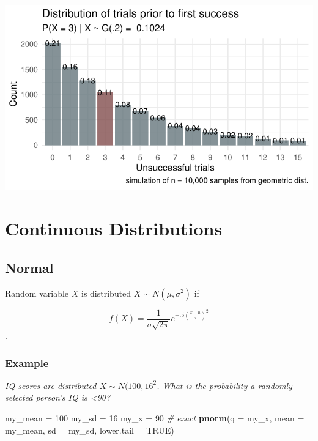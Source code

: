 \documentclass[]{book}
\newenvironment{Shaded}{\begin{snugshade}}{\end{snugshade}}
\newcommand{\CommentTok}[1]{\textcolor[rgb]{0.56,0.35,0.01}{\textit{#1}}}
\newcommand{\DataTypeTok}[1]{\textcolor[rgb]{0.13,0.29,0.53}{#1}}
\newcommand{\DecValTok}[1]{\textcolor[rgb]{0.00,0.00,0.81}{#1}}
\newcommand{\KeywordTok}[1]{\textcolor[rgb]{0.13,0.29,0.53}{\textbf{#1}}}
\newcommand{\NormalTok}[1]{#1}
\newcommand{\OtherTok}[1]{\textcolor[rgb]{0.56,0.35,0.01}{#1}}
\newcommand{\StringTok}[1]{\textcolor[rgb]{0.31,0.60,0.02}{#1}}
\begin{document}
\includegraphics{data-sci_files/figure-latex/unnamed-chunk-12-1.pdf}

\hypertarget{continuous-distributions}{%
\section{Continuous Distributions}\label{continuous-distributions}}

\hypertarget{normal}{%
\subsection{Normal}\label{normal}}

Random variable \(X\) is distributed \(X \sim N(\mu, \sigma^2)\) if

\[f(X)=\frac{{1}}{{\sigma \sqrt{{2\pi}}}}e^{-.5(\frac{{x-\mu}}{{\sigma}})^2}\].

\hypertarget{example}{%
\subsubsection*{Example}\label{example}}

\emph{IQ scores are distributed \(X \sim N(100, 16^2\). What is the probability a randomly selected person's IQ is \textless90?}

\begin{Shaded}
\begin{Highlighting}[]
\NormalTok{my_mean =}\StringTok{ }\DecValTok{100}
\NormalTok{my_sd =}\StringTok{ }\DecValTok{16}
\NormalTok{my_x =}\StringTok{ }\DecValTok{90}
\CommentTok{# exact}
\KeywordTok{pnorm}\NormalTok{(}\DataTypeTok{q =}\NormalTok{ my_x, }\DataTypeTok{mean =}\NormalTok{ my_mean, }\DataTypeTok{sd =}\NormalTok{ my_sd, }\DataTypeTok{lower.tail =} \OtherTok{TRUE}\NormalTok{)}
\end{Highlighting}
\end{Shaded}
\end{document}
